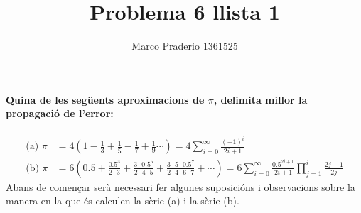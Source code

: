 \documentclass[a4paper,10pt]{article}
\title{Problema 6 llista 1}
\author{Marco Praderio 1361525}
\date{}
\renewcommand{\*}{\cdot}
\begin{document}
\maketitle
\paragraph{Quina de les següents aproximacions de $\pi$, delimita millor la propagació de l'error:}
\begin{equation*}
\begin{split}
 \text{(a) }\pi&=4\left(1-\frac{1}{3}+\frac{1}{5}-\frac{1}{7}+\frac{1}{9}\cdots\right)=4\sum_{i=0}^{\infty}\frac{(-1)^i}{2i+1}\\
 \text{(b) }\pi&=6\left(0.5+\frac{0.5^3}{2\*3}+\frac{3\*0.5^5}{2\*4\*5}+\frac{3\*5\*0.5^7}{2\*4\*6\*7}+\cdots\right)=6\sum_{i=0}^{\infty}\frac{0.5^{2i+1}}{2i+1}
 \prod_{j=1}^i\frac{2j-1}{2j}
 \end{split}
\end{equation*}
Abans de començar serà necessari fer algunes suposicións i observacions sobre la manera en la que és calculen la sèrie (a) i la sèrie (b).
\end{document}

